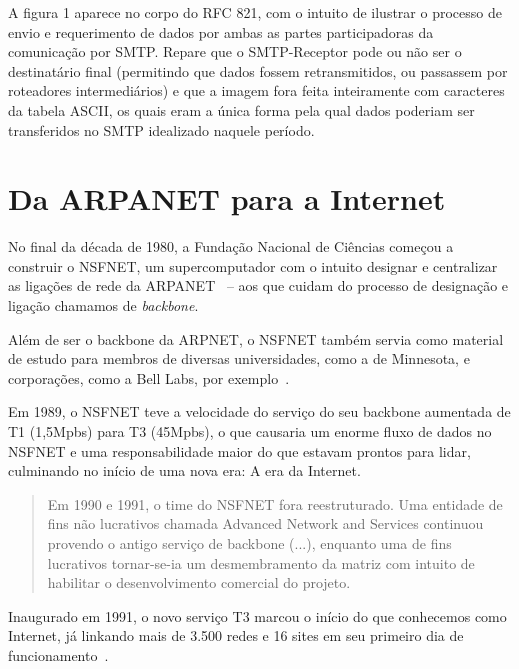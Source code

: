 \documentclass[conference]{IEEEtran}
\begin{document}
	A figura 1 aparece no corpo do RFC 821, com o intuito de ilustrar o processo de envio e requerimento de dados por ambas as partes participadoras da comunicação por SMTP. Repare que o SMTP-Receptor pode ou não ser o destinatário final (permitindo que dados fossem retransmitidos, ou passassem por roteadores intermediários) e que a imagem fora feita inteiramente com caracteres da tabela ASCII, os quais eram a única forma pela qual dados poderiam ser transferidos no SMTP idealizado naquele período.~\cite{rfc821}


	
\section{Da ARPANET para a Internet}

  No final da década de 1980, a Fundação Nacional de Ciências começou a
  construir o NSFNET, um supercomputador com o intuito designar e centralizar as
  ligações de rede da ARPANET~\cite{nsfnet} -- aos que cuidam do processo de designação e
  ligação chamamos de \emph{backbone}.

  Além de ser o backbone da ARPNET, o NSFNET também servia como material de
  estudo para membros de diversas universidades, como a de Minnesota, e
  corporações, como a Bell Labs, por exemplo~\cite{nsfnet}.

  Em 1989, o NSFNET teve a velocidade do serviço do seu backbone aumentada de T1
  (1,5Mpbs) para T3 (45Mpbs), o que causaria um enorme fluxo de dados no NSFNET
  e uma responsabilidade maior do que estavam prontos para lidar, culminando no
  início de uma nova era: A era da Internet.

  \begin{quote}

    Em 1990 e 1991, o time do NSFNET fora reestruturado. Uma entidade de
    fins não lucrativos chamada Advanced Network and Services continuou provendo
    o antigo serviço de backbone (...), enquanto uma de fins lucrativos
    tornar-se-ia um desmembramento da matriz com intuito de habilitar o
    desenvolvimento comercial do projeto.~\cite{nsfnet}

  \end{quote}

  Inaugurado em 1991, o novo serviço T3 marcou o início do que conhecemos como
  Internet, já linkando mais de 3.500 redes e 16 sites em seu primeiro dia de
  funcionamento~\cite{nsfnet}.
\end{document}
